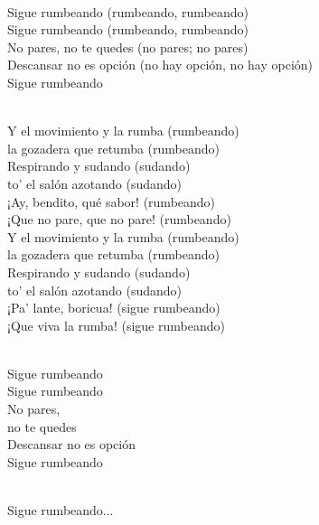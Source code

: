 \begin{lyrics}
\\
Sigue rumbeando (rumbeando, rumbeando)\\
Sigue rumbeando (rumbeando, rumbeando)\\
No pares, no te quedes (no pares; no pares)\\
Descansar no es opción (no hay opción, no hay opción)\\
Sigue rumbeando

\\
Y el movimiento y la rumba (rumbeando)\\
la gozadera que retumba (rumbeando)\\
Respirando y sudando (sudando)\\
to' el salón azotando (sudando)\\
¡Ay, bendito, qué sabor! (rumbeando)\\
¡Que no pare, que no pare! (rumbeando)\\
Y el movimiento y la rumba (rumbeando)\\
la gozadera que retumba (rumbeando)\\
Respirando y sudando (sudando)\\
to' el salón azotando (sudando)\\
¡Pa' lante, boricua! (sigue rumbeando)\\
¡Que viva la rumba! (sigue rumbeando)

\\
Sigue rumbeando\\
Sigue rumbeando\\
No pares,\\
no te quedes\\
Descansar no es opción\\
Sigue rumbeando

\\
Sigue rumbeando...
\end{lyrics}


